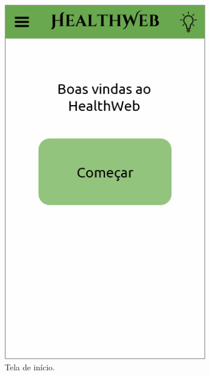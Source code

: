 \begin{figure}[htbp]
	\centering
	\hspace{0.24\linewidth}
	\hfill
	\begin{subfigure}{0.24\linewidth}
		\centering
		\includegraphics[width=\linewidth]{figure/prototype/mobile/home.png}
		\caption{Tela de início.}
		\label{fig:mobile:home}
	\end{subfigure}
	\hfill
	\begin{subfigure}{0.24\linewidth}
		\centering

\end{subfigure}
\end{figure}
